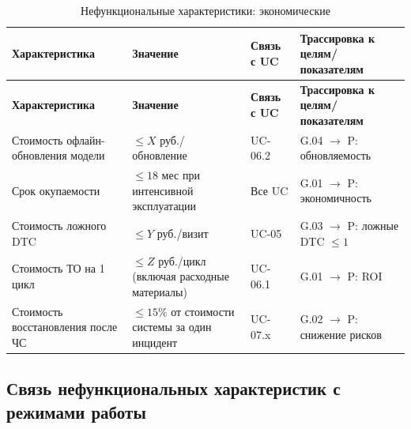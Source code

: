 \documentclass[14pt, a4paper]{extarticle}
\begin{document}
				\begin{xltabular}{\textwidth}{|L|L|L|L|}
					\caption{Нефункциональные характеристики: экономические}\label{tab:nfr-cost}\\
					\hline
					\textbf{Характеристика} & \textbf{Значение} & \textbf{Связь с UC} & \textbf{Трассировка к целям/показателям} \\
					\hline
					\endfirsthead
					\hline
					\textbf{Характеристика} & \textbf{Значение} & \textbf{Связь с UC} & \textbf{Трассировка к целям/показателям} \\
					\hline
					\endhead
					\hline
					\endfoot
					\hline
					\endlastfoot
					Стоимость офлайн-обновления модели & \(\leq X\) руб./обновление & UC-06.2 & G.04 \(\to\) P: обновляемость \\
					\hline
					Срок окупаемости & \(\leq 18\) мес при интенсивной эксплуатации & Все UC & G.01 \(\to\) P: экономичность \\
					\hline
					Стоимость ложного DTC & \(\leq Y\) руб./визит & UC-05 & G.03 \(\to\) P: ложные DTC \(\leq 1\) \\
					\hline
					Стоимость ТО на 1 цикл & \(\leq Z\) руб./цикл (включая расходные материалы) & UC-06.1 & G.01 \(\to\) P: ROI \\
					\hline
					Стоимость восстановления после ЧС & \(\leq 15\%\) от стоимости системы за один инцидент & UC-07.x & G.02 \(\to\) P: снижение рисков \\
					\hline
				\end{xltabular}
				
				\subsection{Связь нефункциональных характеристик с режимами работы}
				
\end{document}

